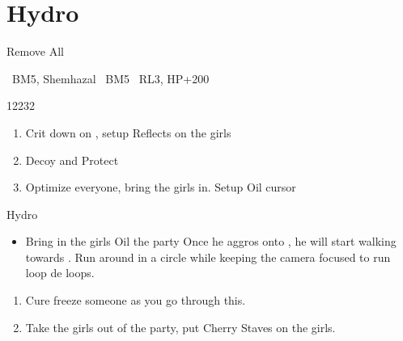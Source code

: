 \chapter{Hydro}

\begin{equip}
Remove All
\end{equip}
\begin{liscense}
\ashe\ BM5, Shemhazal
\penelo\ BM5
\vaan\ RL3, HP+200
\end{liscense}
\begin{shop}{12232}
\end{shop}
\begin{enumerate}
\item Crit down on \penelo, setup Reflects on the girls
\item Decoy and Protect \vaan
\item Optimize everyone, bring the girls in. Setup Oil cursor
\end{enumerate}
\begin{gambit}
\begin{itemize}
\end{itemize}
\end{gambit}
\begin{battle}{Hydro}
\begin{itemize}
\item Bring in the girls
\penelof Oil the party
\vaanf Once he aggros onto \vaan, he will start walking towards \vaan. Run around in a circle while keeping the camera focused to run loop de loops.
\end{itemize}
\end{battle}
\begin{enumerate}
\item Cure freeze someone as you go through this.
\item Take the girls out of the party, put Cherry Staves on the girls.
\end{enumerate}